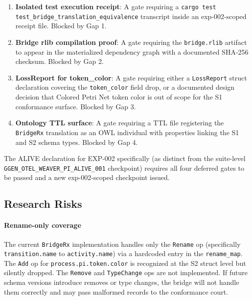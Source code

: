 \begin{enumerate}
    \item \textbf{Isolated test execution receipt}: A gate requiring a
          \texttt{cargo test test\_bridge\_translation\_equivalence} transcript
          inside an exp-002-scoped receipt file. Blocked by Gap 1.
    \item \textbf{Bridge rlib compilation proof}: A gate requiring the
          \texttt{bridge.rlib} artifact to appear in the materialized dependency
          graph with a documented SHA-256 checksum. Blocked by Gap 2.
    \item \textbf{LossReport for token\_color}: A gate requiring either a
          \texttt{LossReport} struct declaration covering the \texttt{token\_color}
          field drop, or a documented design decision that Colored Petri Net token
          color is out of scope for the S1 conformance surface. Blocked by Gap 3.
    \item \textbf{Ontology TTL surface}: A gate requiring a TTL file registering
          the \texttt{BridgeRx} translation as an OWL individual with properties
          linking the S1 and S2 schema types. Blocked by Gap 4.
\end{enumerate}

The ALIVE declaration for EXP-002 specifically (as distinct from the suite-level
\texttt{GGEN\_OTEL\_WEAVER\_PI\_ALIVE\_001} checkpoint) requires all four deferred
gates to be passed and a new exp-002-scoped checkpoint issued.

\subsection{Research Risks}
\label{sec:otel-weaver-exp-002-diff-to-residual-open-risks}

\paragraph{Rename-only coverage}
The current \texttt{BridgeRx} implementation handles only the \texttt{Rename} op
(specifically \texttt{transition.name} to \texttt{activity.name}) via a hardcoded
entry in the \texttt{rename\_map}. The \texttt{Add} op for
\texttt{process.pi.token.color} is recognized at the S2 struct level but silently
dropped. The \texttt{Remove} and \texttt{TypeChange} ops are not implemented. If
future schema versions introduce removes or type changes, the bridge will not handle
them correctly and may pass malformed records to the conformance court.


